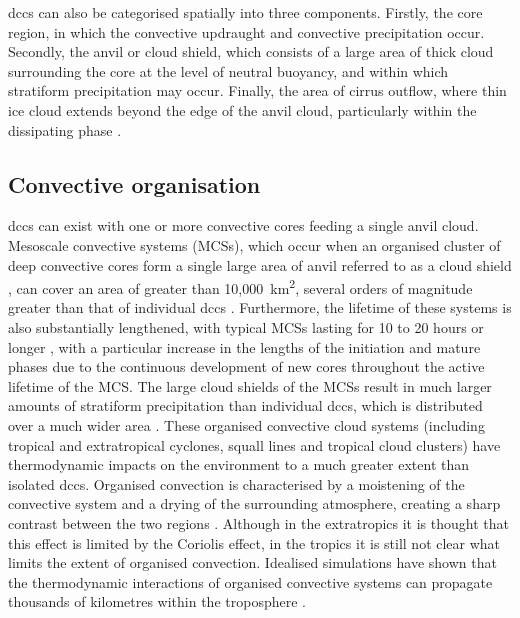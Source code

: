 \acrshort{dcc}s can also be categorised spatially into three components.
Firstly, the core region, in which the convective updraught and convective precipitation occur.
Secondly, the anvil or cloud shield, which consists of a large area of thick cloud surrounding the core at the level of neutral buoyancy, and within which stratiform precipitation may occur.
Finally, the area of cirrus outflow, where thin ice cloud extends beyond the edge of the anvil cloud, particularly within the dissipating phase \citep{lilly_cirrus_1988}.


\subsection{Convective organisation}

\acrshort{dcc}s can exist with one or more convective cores feeding a single anvil cloud.
Mesoscale convective systems (MCSs), which occur when an organised cluster of deep convective cores form a single large area of anvil referred to as a cloud shield \citep{roca_simple_2017}, can cover an area of greater than 10,000~km\textsuperscript{2}, several orders of magnitude greater than that of individual \acrshort{dcc}s \citep{houze_mesoscale_2004}.
Furthermore, the lifetime of these systems is also substantially lengthened, with typical MCSs lasting for 10 to 20 hours or longer \citep{chen_diurnal_1997}, with a particular increase in the lengths of the initiation and mature phases \citep{wall_life_2018} due to the continuous development of new cores throughout the active lifetime of the MCS.
The large cloud shields of the MCSs result in much larger amounts of stratiform precipitation than individual \acrshort{dcc}s, which is distributed over a much wider area \citep{houze_chapter_2014}.
These organised convective cloud systems (including tropical and extratropical cyclones, squall lines and tropical cloud clusters) have thermodynamic impacts on the environment to a much greater extent than isolated \acrshort{dcc}s.
Organised convection is characterised by a moistening of the convective system and a drying of the surrounding atmosphere, creating a sharp contrast between the two regions \citep{houze_chapter_2014}.
Although in the extratropics it is thought that this effect is limited by the Coriolis effect, in the tropics it is still not clear what limits the extent of organised convection.
Idealised simulations have shown that the thermodynamic interactions of organised convective systems can propagate thousands of kilometres within the troposphere \citep{beucler_budget_2019}.

